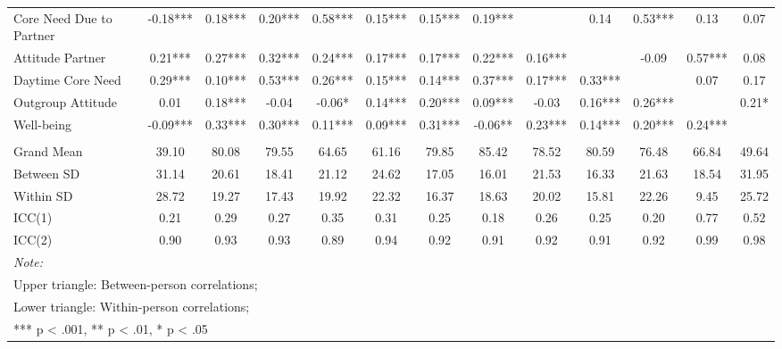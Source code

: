 \begin{sidewaystable*}[!hbtp]
{\begin{tabular}[t]{lcccccccccccc}
\hspace{1em}Core Need Due to Partner & -0.18*** & 0.18*** & 0.20*** & 0.58*** & 0.15*** & 0.15*** & 0.19*** &  & 0.14 & 0.53*** & 0.13 & 0.07\\
\hspace{1em}Attitude Partner & 0.21*** & 0.27*** & 0.32*** & 0.24*** & 0.17*** & 0.17*** & 0.22*** & 0.16*** &  & -0.09 & 0.57*** & 0.08\\
\hspace{1em}Daytime Core Need & 0.29*** & 0.10*** & 0.53*** & 0.26*** & 0.15*** & 0.14*** & 0.37*** & 0.17*** & 0.33*** &  & 0.07 & 0.17\\
\hspace{1em}Outgroup Attitude & 0.01 & 0.18*** & -0.04 & -0.06* & 0.14*** & 0.20*** & 0.09*** & -0.03 & 0.16*** & 0.26*** &  & 0.21*\\
\hspace{1em}Well-being & -0.09*** & 0.33*** & 0.30*** & 0.11*** & 0.09*** & 0.31*** & -0.06** & 0.23*** & 0.14*** & 0.20*** & 0.24*** & \\
\addlinespace[0.3em]
\multicolumn{13}{l}{\textbf{Descriptives}}\\
\hspace{1em}Grand Mean & 39.10 & 80.08 & 79.55 & 64.65 & 61.16 & 79.85 & 85.42 & 78.52 & 80.59 & 76.48 & 66.84 & 49.64\\
\hspace{1em}Between SD & 31.14 & 20.61 & 18.41 & 21.12 & 24.62 & 17.05 & 16.01 & 21.53 & 16.33 & 21.63 & 18.54 & 31.95\\
\hspace{1em}Within SD & 28.72 & 19.27 & 17.43 & 19.92 & 22.32 & 16.37 & 18.63 & 20.02 & 15.81 & 22.26 & 9.45 & 25.72\\
\hspace{1em}ICC(1) & 0.21 & 0.29 & 0.27 & 0.35 & 0.31 & 0.25 & 0.18 & 0.26 & 0.25 & 0.20 & 0.77 & 0.52\\
\hspace{1em}ICC(2) & 0.90 & 0.93 & 0.93 & 0.89 & 0.94 & 0.92 & 0.91 & 0.92 & 0.91 & 0.92 & 0.99 & 0.98\\
\bottomrule
\multicolumn{13}{l}{\rule{0pt}{1em}\textit{Note: }}\\
\multicolumn{13}{l}{\rule{0pt}{1em}Upper triangle: Between-person correlations;}\\
\multicolumn{13}{l}{\rule{0pt}{1em}Lower triangle: Within-person correlations;}\\
\multicolumn{13}{l}{\rule{0pt}{1em}*** p < .001, ** p < .01,  * p < .05}\\
\end{tabular}}
\end{sidewaystable*}
